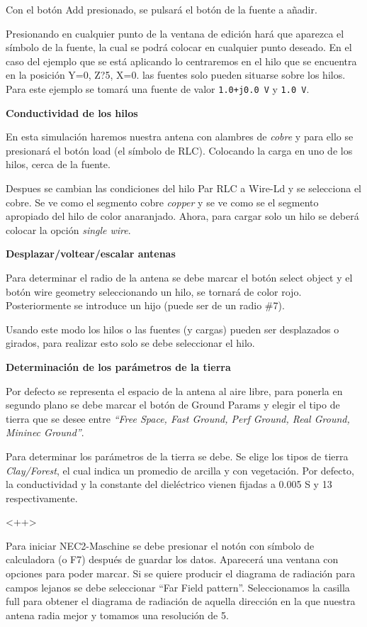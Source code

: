\documentclass[12pt]{article}
\begin{document}
Con el bot\'on Add presionado, se pulsar\'a el bot\'on de la fuente a añadir.

Presionando en cualquier punto de la ventana de edici\'on har\'a que aparezca el
s\'imbolo de la fuente, la cual se podr\'a colocar en cualquier punto deseado.
En el caso del ejemplo que se est\'a aplicando lo centraremos en el hilo que se
encuentra en la posici\'on Y=0, Z?5, X=0. las fuentes solo pueden situarse
sobre los hilos. Para este ejemplo se tomar\'a una fuente de valor
\texttt{1.0+j0.0 V} y \texttt{1.0 V}.

\textbf{Conductividad de los hilos}

En esta simulaci\'on haremos nuestra antena con alambres de \textit{cobre} y
para ello se presionar\'a el bot\'on load (el s\'imbolo de RLC). Colocando la
carga en uno de los hilos, cerca de la fuente.

Despues se cambian las condiciones del hilo Par RLC a Wire-Ld y se selecciona
el cobre. Se ve como el segmento cobre \textit{copper} y se ve como se el
segmento apropiado del hilo de color anaranjado. Ahora, para cargar solo un
hilo se deber\'a colocar la opci\'on \textit{single wire}. 

\textbf{Desplazar/voltear/escalar antenas}

Para determinar el radio de la antena se debe marcar el bot\'on  select object
y el bot\'on wire geometry seleccionando un hilo, se tornar\'a de color rojo.
Posteriormente se introduce un hijo (puede ser de un radio \#7).

Usando este modo los hilos o las fuentes (y cargas) pueden ser desplazados o
girados, para realizar esto solo se debe seleccionar el hilo.

\textbf{Determinaci\'on de los par\'ametros de la tierra}

Por defecto se representa el espacio de la antena al aire libre, para ponerla
en segundo plano se debe marcar el bot\'on de Ground Params y elegir el tipo de
tierra que se desee entre  \textit{``Free Space, Fast Ground, Perf Ground, Real
Ground, Mininec Ground''}.

Para determinar los par\'ametros de la tierra se debe. Se elige los tipos de
tierra \textit{Clay/Forest}, el cual indica un promedio de arcilla y con
vegetaci\'on. Por defecto, la conductividad y la constante del diel\'ectrico
vienen fijadas a 0.005 S y 13 respectivamente.

<++> 

Para iniciar NEC2-Maschine se debe presionar el not\'on con s\'imbolo de
calculadora (o F7) despu\'es de guardar los datos. Aparecer\'a una ventana con
opciones para poder marcar. Si se quiere producir el diagrama de radiación para
campos lejanos se debe seleccionar ``Far Field pattern''. Seleccionamos la
casilla full para obtener el diagrama de radiación de aquella dirección en la
que nuestra antena radia mejor y tomamos una resolución de 5.
\end{document}
